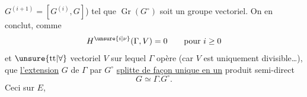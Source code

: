 $G^{(i+1)}=[G^{(i)},G]$) tel que $\operatorname{Gr}(G^\circ)$ soit un groupe vectoriel. On en conclut, comme
\[
H^{\unsure{i|\nu}}(\Gamma,V)=0\qquad\text{pour }i\geq0
\]
et $\unsure{\text{tt}|\forall}$ vectoriel $V$ sur lequel $\Gamma$ opère (car $V$ est uniquement divisible\ldots), que \uline{l'extension} $G$ de $\Gamma$ par $G^\circ$ \uline{splitte de façon unique en un} produit semi-direct
\[
G\simeq\Gamma.G^\circ.
\tag*{(5.5.1)}
\]
Ceci  sur $E$, 

